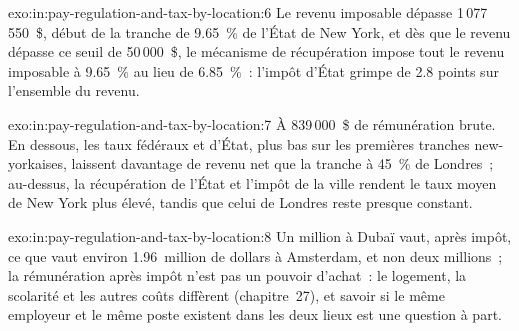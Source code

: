 \begin{solution}{exo:in:pay-regulation-and-tax-by-location:6}
Le revenu imposable dépasse 1\,077\,550~\$, début de la tranche de 9.65~\% de l'État de New York, et dès que le revenu dépasse ce seuil de 50\,000~\$, le
mécanisme de récupération impose tout le revenu imposable à 9.65~\% au lieu de 6.85~\%~: l'impôt d'État grimpe de 2.8 points sur l'ensemble du revenu.
\end{solution}

\begin{solution}{exo:in:pay-regulation-and-tax-by-location:7}
À 839\,000~\$ de rémunération brute. En dessous, les taux fédéraux et d'État, plus bas sur les premières tranches new-yorkaises, laissent davantage de revenu net
que la tranche à 45~\% de Londres~; au-dessus, la récupération de l'État et l'impôt de la ville rendent le taux moyen de New York plus élevé, tandis que celui de Londres reste presque
constant.
\end{solution}

\begin{solution}{exo:in:pay-regulation-and-tax-by-location:8}
Un million à Dubaï vaut, après impôt, ce que vaut environ 1.96~million de dollars à Amsterdam, et non deux millions~; la rémunération après impôt
n'est pas un pouvoir d'achat~: le logement, la scolarité et les autres coûts diffèrent (chapitre~27), et savoir si le même employeur et
le même poste existent dans les deux lieux est une question à part.
\end{solution}

